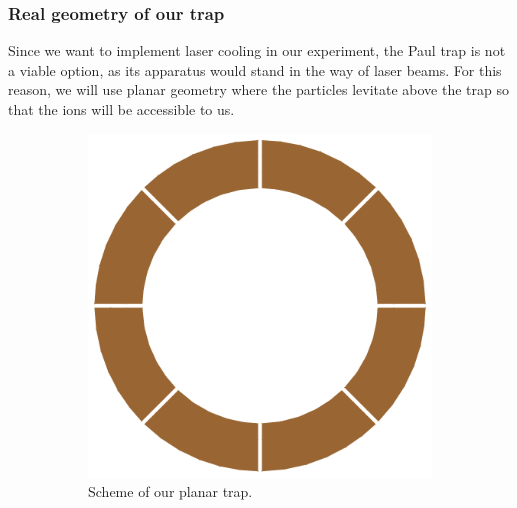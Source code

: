 \subsubsection{Real geometry of our trap}
Since we want to implement laser cooling in our experiment, the Paul trap is not a viable option, as its apparatus would stand in the way of laser beams. For this reason, we will use planar geometry where the particles levitate above the trap so that the ions will be accessible to us.
\begin{figure}[H]
\begin{subfigure}{.5\textwidth}
  \centering
  \includegraphics[width=\linewidth]{img/real_trap_geometry_1.pdf}
  \caption{Scheme of our planar trap.}
  \label{fig:Real trap geometry 1}
\end{subfigure}%
\begin{subfigure}{.5\textwidth}
  \centering

\end{subfigure}
\end{figure}

